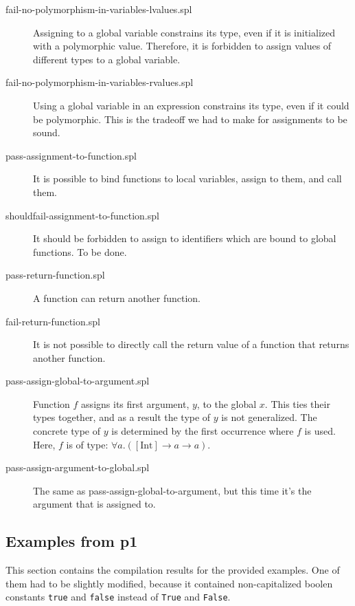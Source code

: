 \documentclass[a4paper]{article}
\newcommand{\arr}{\rightarrow}
\begin{document}
\begin{description}
  \item[fail-no-polymorphism-in-variables-lvalues.spl] Assigning to a global
  variable constrains its type, even if it is initialized with a polymorphic
  value.  Therefore, it is forbidden to assign values of different types to a
  global variable.

  \item[fail-no-polymorphism-in-variables-rvalues.spl] Using a global variable
  in an expression constrains its type, even if it could be polymorphic.  This
  is the tradeoff we had to make for assignments to be sound.

  \item[pass-assignment-to-function.spl] It is possible to bind functions to
  local variables, assign to them, and call them.

  \item[shouldfail-assignment-to-function.spl] It should be forbidden to assign
  to identifiers which are bound to global functions.  To be done.

  \item[pass-return-function.spl] A function can return another function.

  \item[fail-return-function.spl] It is not possible to directly call the return
  value of a function that returns another function.

  \item[pass-assign-global-to-argument.spl] Function $f$ assigns its first
  argument, $y$, to the global $x$.  This ties their types together, and as a
  result the type of $y$ is not generalized.  The concrete type of $y$ is
  determined by the first occurrence where $f$ is used.  Here, $f$ is of type:
  $\forall a . ([\text{Int}] \arr a \arr a)$.

  \item[pass-assign-argument-to-global.spl] The same as
  pass-assign-global-to-argument, but this time it's the argument that is
  assigned to.

\end{description}

\subsection{Examples from p1}

This section contains the compilation results for the provided examples.  One
of them had to be slightly modified, because it contained non-capitalized
boolen constants \texttt{true} and \texttt{false} instead of \texttt{True} and
\texttt{False}.
\end{document}
